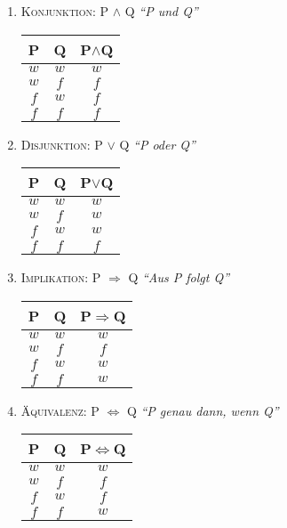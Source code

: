 \documentclass[11pt,a4paper,oneside]{article}
\begin{document}
{\begin{enumerate}
  \item \textsc{Konjunktion:} P $\land$ Q \emph{``P und Q''}\\[5pt]
    \begin{tabular}{c | c | c}
      P & Q & P$\land$Q \\
      \hline
      $w$ & $w$ & $w$ \\
      $w$ & $f$ & $f$ \\
      $f$ & $w$ & $f$ \\
      $f$ & $f$ & $f$ \\
    \end{tabular}

  \item \textsc{Disjunktion:} P $\lor$ Q \emph{``P oder Q''}\\[5pt]
    \begin{tabular}{c | c | c}
      P & Q & P$\lor$Q \\
      \hline
      $w$ & $w$ & $w$ \\
      $w$ & $f$ & $w$ \\
      $f$ & $w$ & $w$ \\
      $f$ & $f$ & $f$ \\
    \end{tabular}

  \item \textsc{Implikation:} P $\Rightarrow$ Q \emph{``Aus P folgt Q''}\\[5pt]
    \begin{tabular}{c | c | c}
      P & Q & P$\Rightarrow$Q \\
      \hline
      $w$ & $w$ & $w$ \\
      $w$ & $f$ & $f$ \\
      $f$ & $w$ & $w$ \\
      $f$ & $f$ & $w$ \\
    \end{tabular}

  \newpage

  \item \textsc{Äquivalenz:} P $\Leftrightarrow$ Q \emph{``P genau dann, wenn Q''}\\[5pt]
    \begin{tabular}{c | c | c}
      P & Q & P$\Leftrightarrow$Q \\
      \hline
      $w$ & $w$ & $w$ \\
      $w$ & $f$ & $f$ \\
      $f$ & $w$ & $f$ \\
      $f$ & $f$ & $w$ \\
    \end{tabular}
\end{enumerate}

}
\end{document}
